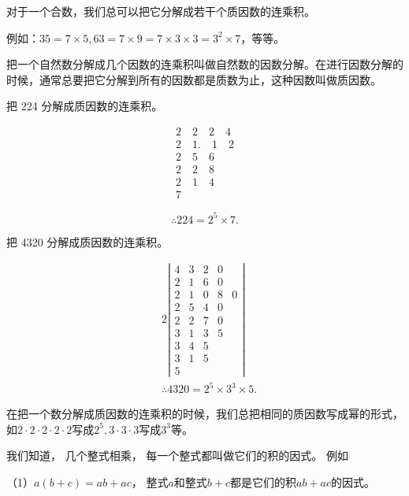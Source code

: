 对于一个合数，我们总可以把它分解成若干个质因数的连乘积。

例如：\(35 = 7 \times 5, 63 = 7 \times 9 = 7 \times 3 \times 3 = 3^2 \times 7\)，等等。

把一个自然数分解成几个因数的连乘积叫做自然数的因数分解。在进行因数分解的时候，通常总要把它分解到所有的因数都是质数为止，这种因数叫做质因数。

 把 224 分解成质因数的连乘积。


\[
\begin{array}{r} 2 \quad 2 \quad 2 \quad 4 \\ 2 \quad 1. \quad 1 \quad 2 \\ \hline 2 \quad 5 \quad 6 \\ 2 \quad 2 \quad 8 \\ \hline 2 \quad 1 \quad 4 \\ \hline 7 \end{array}
\]

\[
\therefore 224 = 2 ^{5} \times 7.
\]

 把 4320 分解成质因数的连乘积。


\[
\begin{array}{rl} & 2 \left| \begin{array}{lllll} 4 & 3 & 2 & 0 \\ 2 & 1 & 6 & 0 \\ 2 & 1 & 0 & 8 & 0 \\ \hline 2 & 5 & 4 & 0 \\ 2 & 2 & 7 & 0 \\ 3 & 1 & 3 & 5 \\ \hline 3 & 4 & 5 \\ 3 & 1 & 5 \\ \hline 5 \end{array} \right| \\ & \therefore 4320 = 2 ^{5} \times 3 ^{3} \times 5. \end{array}
\]

在把一个数分解成质因数的连乘积的时候，我们总把相同的质因数写成幂的形式，如\(2 \cdot 2 \cdot 2 \cdot 2 \cdot 2\)写成\(2^5, 3 \cdot 3 \cdot 3\)写成\(3^3\)等。

我们知道， 几个整式相乘， 每一个整式都叫做它们的积的因式。 例如

（1）\(a(b + c) = ab + ac\)，
整式\(a\)和整式\(b + c\)都是它们的积\(ab + ac\)的因式。

